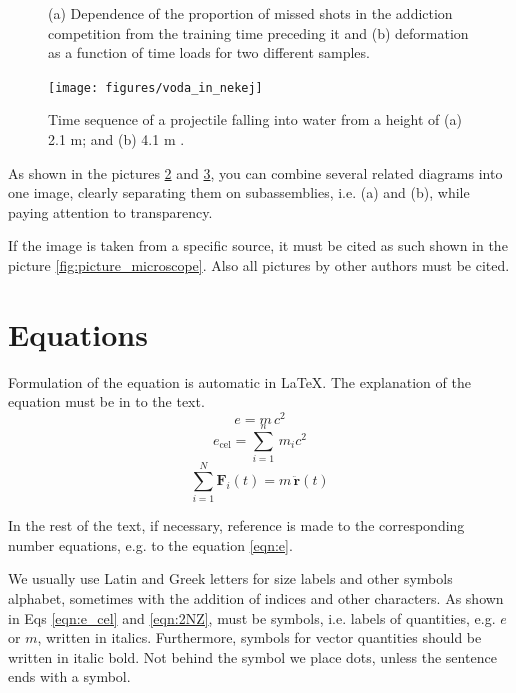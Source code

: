 \begin{figure}
\begin{subfigure}[b]{.45\linewidth}
\caption{}\label{subfig:graph2}
\end{subfigure}

\caption{(a) Dependence of the proportion of missed shots in the addiction competition
from the training time preceding it and (b) deformation as a function of time
loads for two different samples.}\label{fig:2_graph}
\end{figure}

\begin{figure}[ht!]
\begin{centering}
\texttt{[image: figures/voda\_in\_nekej]}
\caption{Time sequence of a projectile falling into water from a height of (a) 2.1 m;
and (b)
4.1 m \cite{Loukides_2020}.} \label{fig:voda_in_nekej}
\end{centering}
\end{figure}

As shown in the pictures \ref{fig:2_graph} and \ref{fig:voda_in_nekej}, you can
combine several related diagrams into one image, clearly separating them on
subassemblies, i.e. (a) and (b), while paying attention to transparency.

If the image is taken from a specific source, it must be cited as such
shown in the picture \ref{fig:picture_microscope}. Also all pictures by other authors
must be cited.

\section{Equations}\label{sec:equations}

Formulation of the equation is automatic in \LaTeX. The explanation of the equation must be in
to the text.
\begin{equation}\label{eqn:e}
e = m\,c^2
\end{equation}
\begin{equation}\label{eqn:e_cel}
e_{\text{cel}}=\sum_{i=1}^{n}\,m_{i}c^2
\end{equation}
\begin{equation}\label{eqn:2NZ}
	\sum_{i=1}^{N}\bm{F}_i(t)=m\,\ddot{\bm{r}}(t)
\end{equation}

In the rest of the text, if necessary, reference is made to the corresponding number
equations, e.g. to the equation \eqref{eqn:e}.

We usually use Latin and Greek letters for size labels and other symbols
alphabet, sometimes with the addition of indices and other characters. As shown in Eqs
\eqref{eqn:e_cel} and \eqref{eqn:2NZ}, must be symbols, i.e. labels of quantities,
e.g. $e$ or $m$, written in italics. Furthermore, symbols for vector quantities should be written in italic bold. Not behind the symbol
we place dots, unless the sentence ends with a symbol.


